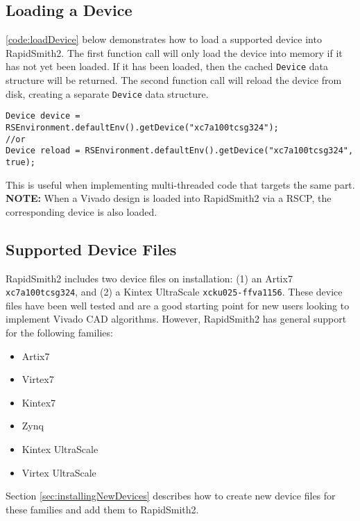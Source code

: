 \subsection{Loading a Device} \label{sec:loadingDevice}
\autoref{code:loadDevice} below demonstrates how to load a supported device
into RapidSmith2.  The first function call will only load the device into memory
if it has not yet been loaded. If it has been loaded, then the cached
\texttt{Device} data structure will be returned. The second function call will
reload the device from disk, creating a separate \texttt{Device} data
structure. 

\begin{lstlisting}[xleftmargin=1.5em, framexleftmargin=1.5em, caption=Loading a
Device, label=code:loadDevice] 
Device device = RSEnvironment.defaultEnv().getDevice("xc7a100tcsg324");
//or
Device reload = RSEnvironment.defaultEnv().getDevice("xc7a100tcsg324", true);
\end{lstlisting}

\noindent This is useful when implementing multi-threaded code that targets
the same part. \textbf{NOTE:} When a Vivado design is loaded into RapidSmith2
via a RSCP, the corresponding device is also loaded.


\subsection{Supported Device Files} \label{sec:supportedDevices}
RapidSmith2 includes two device files on installation: (1) an Artix7
\texttt{xc7a100tcsg324}, and (2) a Kintex UltraScale \texttt{xcku025-ffva1156}.
These device files have been well tested and are a good starting point for new
users looking to implement Vivado CAD algorithms. However, RapidSmith2 has
general support for the following families:

\begin{multicols}{2}
	\begin{itemize}
	  \item Artix7
	  \item Virtex7
	  \item Kintex7
	  \item Zynq
	  \item Kintex UltraScale
	  \item Virtex UltraScale
 	\end{itemize}
\end{multicols}

\noindent Section \ref{sec:installingNewDevices} describes how to create new
device files for these families and add them to RapidSmith2.
